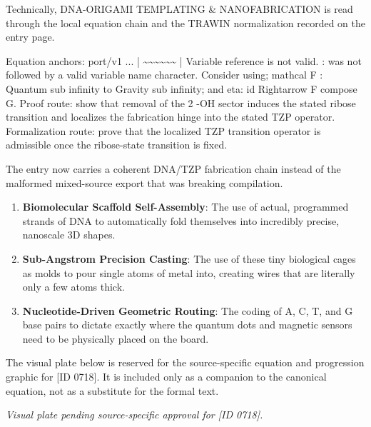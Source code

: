 Technically, DNA-ORIGAMI TEMPLATING \& NANOFABRICATION is read through the local equation chain and the TRAWIN normalization recorded on the entry page.

Equation anchors: port/v1 ... | \textasciitilde{}\textasciitilde{}\textasciitilde{}\textasciitilde{}\textasciitilde{}\textasciitilde{} | Variable reference is not valid. : was not followed by a valid variable name character. Consider using; mathcal F : Quantum sub infinity to Gravity sub infinity; and eta: id Rightarrow F compose G. Proof route: show that removal of the 2 -OH sector induces the stated ribose transition and localizes the fabrication hinge into the stated TZP operator. Formalization route: prove that the localized TZP transition operator is admissible once the ribose-state transition is fixed.

The entry now carries a coherent DNA/TZP fabrication chain instead of the malformed mixed-source export that was breaking compilation.
\endgroup

\begin{enumerate}[leftmargin=1.6em,itemsep=6pt,topsep=4pt]
\item \textbf{Biomolecular Scaffold Self-Assembly}: The use of actual, programmed strands of DNA to automatically fold themselves into incredibly precise, nanoscale 3D shapes.
\item \textbf{Sub-Angstrom Precision Casting}: The use of these tiny biological cages as molds to pour single atoms of metal into, creating wires that are literally only a few atoms thick.
\item \textbf{Nucleotide-Driven Geometric Routing}: The coding of A, C, T, and G base pairs to dictate exactly where the quantum dots and magnetic sensors need to be physically placed on the board.
\end{enumerate}

\begingroup\footnotesize\sloppy
The visual plate below is reserved for the source-specific equation and progression graphic for [ID 0718]. It is included only as a companion to the canonical equation, not as a substitute for the formal text.
\par\endgroup
\begingroup\footnotesize\itshape
Visual plate pending source-specific approval for [ID 0718].
\par\endgroup

